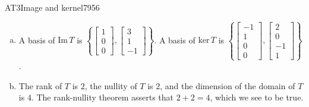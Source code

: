 \begin{exercise}{AT3}{Image and kernel}{7956}
\begin{exerciseAnswer}
\begin{enumerate}[(a)]
 
\item  

 A basis of \(\mathrm{Im}\,T\) is \(\left\{ \left[\begin{array}{c}
1 \\
0 \\
0
\end{array}\right] , \left[\begin{array}{c}
3 \\
1 \\
-1
\end{array}\right] \right\}\). A basis of \(\mathrm{ker}\,T\) is \(\left\{ \left[\begin{array}{c}
-1 \\
1 \\
0 \\
0
\end{array}\right] , \left[\begin{array}{c}
2 \\
0 \\
-1 \\
1
\end{array}\right] \right\}\). 

 
\item  

 The rank of \(T\) is \(2\), the nullity of \(T\) is \(2\), and the dimension of the domain of \(T\) is \(4\). The rank-nullity theorem asserts that \(2+2=4\), which we see to be true. 

 
\end{enumerate}

     \end{exerciseAnswer}
 \end{exercise}


